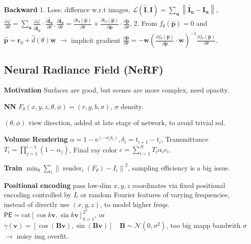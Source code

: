 \textbf{Backward}
1. Loss: differnce w.r.t images, \(\mathcal{L}(\hat{\mathbf{I}}, \mathbf{I})=\sum_{\mathbf{u}}\left\|\hat{\mathbf{I}}_{\mathbf{u}}-\mathbf{I}_{\mathbf{u}}\right\|\),
% 
\(\frac{\partial \mathcal{L}}{\partial \theta}=\sum_{\mathbf{u}} \frac{\partial \mathcal{L}}{\partial \hat{\mathbf{I}}_{\mathbf{u}}} \cdot \frac{\partial \hat{\mathbf{I}}_{\mathbf{u}}}{\partial \theta},
% 
\frac{\partial \hat{\mathbf{I}}_{\mathbf{u}}}{\partial \theta}=\frac{\partial \mathrm{t}_{\theta}(\widehat{\mathbf{p}})}{\partial \theta}+\frac{\partial \mathrm{t}_{\theta}(\widehat{\mathbf{p}})}{\partial \widehat{\mathbf{p}}} \cdot \frac{\partial \widehat{\mathbf{p}}}{\partial \theta}\),
2. From \(f_{\theta}(\widehat{\mathbf{p}})=0\) and \(\widehat{\mathbf{p}}=\mathbf{r}_{0}+\hat{d}(\theta) \mathbf{w}\) \(\to\) implicit gradient \(\frac{\partial \widehat{\mathbf{p}}}{\partial \theta}=-\mathbf{w}\left(\frac{\partial f_{\theta}(\widehat{\mathbf{p}})}{\partial \widehat{\mathbf{p}}} \cdot \mathbf{w}\right)^{-1} \frac{\partial f_{\theta}(\widehat{\mathbf{p}})}{\partial \theta}\).


\subsection*{Neural Radiance Field (NeRF)}
\textbf{Motivation} Surfaces are good, but scenes are more complex, need opacity.

\textbf{NN} \(F_\theta(x,y, z, \theta, \phi) = (r,g,b, \sigma)\), \(\sigma\) density.

\((\theta, \phi)\) view direction, added at late stage of network, to avoid trivial sol.


\textbf{Volume Rendering}
% 
\(\alpha=1-\mathrm{e}^{\left(-\sigma_{i} \delta_{i}\right)}, \delta_{i}=t_{i+1}-t_{i}\), Transmittance \(T_{i}=\prod_{j=1}^{i-1}\left(1-\alpha_{j}\right)\), Final ray color \(c=\sum_{i=1}^{N} {T_{i} \alpha_{i}} c_{i}\).

\textbf{Train} \(\min _{\theta} \sum_{i}\left\|\operatorname{render}_{i}\left(F_{\theta}\right)-I_{i}\right\|^{2}\), sampling efficiency is a big issue.

\textbf{Positional encoding} pass low-dim \(x,y,z\) coordinates via fixed positional encoding controlled by \(L\) or random Fourier features of varying frequencies, instead of directly use \((x,y,z)\), to model higher freqs.
% 
\(\mathsf{PE} = \text{cat}[\cos k\mathbf{v}, \sin k\mathbf{v}]_{k=1}^{2^L}\), 
% 
or \(\gamma(\mathbf{v})=[\cos (\mathbf{B v}), \sin (\mathbf{B v})] \quad \mathbf{B} \sim \mathcal{N}\left(0, \sigma^{2}\right)\), too big mapp bandwith \(\sigma\) $\rightarrow$ noisy img overfit.

